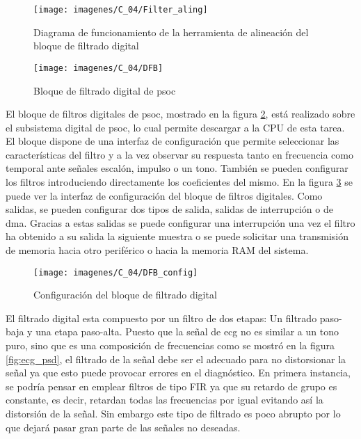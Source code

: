 \begin{figure}[!ht]
	\center
	\texttt{[image: imagenes/C\_04/Filter\_aling]}
	\caption{Diagrama de funcionamiento de la herramienta de alineación del bloque de filtrado digital}
	\label{fig:Filter_aling}
\end{figure}


\begin{figure}[!ht]
	\center
	\texttt{[image: imagenes/C\_04/DFB]}
	\caption{Bloque de filtrado digital de \acrshort{psoc}}
	\label{fig:DFB}
\end{figure}


El bloque de filtros digitales de \acrshort{psoc}, mostrado en la figura \ref{fig:DFB}, está realizado sobre el subsistema digital de \acrshort{psoc}, lo cual permite descargar a la CPU de esta tarea. El bloque dispone de una interfaz de configuración que permite seleccionar las características del filtro y a la vez observar su respuesta tanto en frecuencia como temporal ante señales escalón, impulso o un tono. También se pueden configurar los filtros introduciendo directamente los coeficientes del mismo. En la figura \ref{fig:DFB_conf} se puede ver la interfaz de configuración del bloque de filtros digitales. Como salidas, se pueden configurar dos tipos de salida, salidas de interrupción o de \acrshort{dma}. Gracias a estas salidas se puede configurar una interrupción una vez el filtro ha obtenido a su salida la siguiente muestra o se puede solicitar una transmisión de memoria hacia otro periférico o hacia la memoria RAM del sistema.

\begin{figure}[!ht]
	\center
	\texttt{[image: imagenes/C\_04/DFB\_config]}
	\caption{Configuración del bloque de filtrado digital}
	\label{fig:DFB_conf}
\end{figure}



El filtrado digital esta compuesto por un filtro de dos etapas: Un filtrado paso-baja y una etapa paso-alta. Puesto que la señal de \acrshort{ecg} no es similar a un tono puro, sino que es una composición de frecuencias como se mostró en la figura  \ref{fig:ecg_psd}, el filtrado de la señal debe ser el adecuado para no distorsionar la señal ya que esto puede provocar errores en el diagnóstico. En primera instancia, se podría pensar en emplear filtros de tipo FIR ya que su retardo de grupo es constante, es decir, retardan todas las frecuencias por igual evitando así la distorsión de la señal. Sin embargo este tipo de filtrado es poco abrupto por lo que dejará pasar gran parte de las señales no deseadas.

